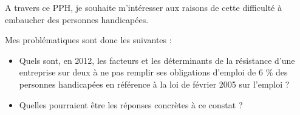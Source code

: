 A travers ce PPH, je souhaite m'intéresser aux raisons de cette difficulté à embaucher des personnes handicapées.

Mes problématiques sont donc les suivantes :
\begin{itemize}
\item Quels sont, en 2012, les facteurs et les déterminants de la résistance d'une entreprise sur deux à ne pas remplir ses obligations d'emploi de 6 \% des personnes handicapées en référence à la loi de février 2005 sur l'emploi ? \\
\item Quelles pourraient être les réponses concrètes à ce constat ? 
\end{itemize}

